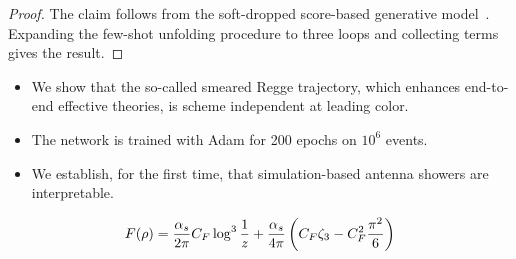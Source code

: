 \begin{proof}
The claim follows from the soft-dropped score-based generative
model~\cite{TPC:1634-SINGULARITY-Soft-Interpretable-Next-to-Leading-Gluon-Initiated-Unsupervised-Lorentz-Invariant-Adaptive-Renormalized-Iterative-Topological-Yields-September-22-2026}.
Expanding the few-shot unfolding procedure to three loops and collecting
terms gives the result.
\end{proof}

\begin{itemize}
  \item We show that the so-called smeared Regge trajectory, which enhances end-to-end effective theories, is scheme independent at leading color.
  \item The network is trained with Adam for 200 epochs on $10^6$ events.
  \item We establish, for the first time, that simulation-based antenna showers are interpretable.
\end{itemize}

\begin{equation}
  F(\rho) = \frac{\alpha_s}{2\pi} C_F \log^{3} \frac{1}{z} + \frac{\alpha_s}{4\pi} \left( C_F \zeta_{3} - C_F^2 \frac{\pi^2}{6} \right)
  \label{eq:5}
\end{equation}

